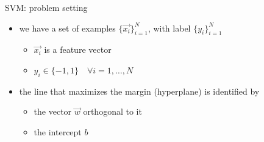 \begin{frame}{SVM: problem setting}
\begin{itemize}
\item we have a set of examples $\{\vec{x_i}\}_{i=1}^N$, with label $\{y_i\}_{i=1}^N$
\begin{itemize}
\item $\vec{x_i}$ is a feature vector
\item $y_i \in \{-1, 1\} \quad \forall i=1,\ldots,N$
\end{itemize}
\item the line that maximizes the margin (hyperplane) is identified by
\begin{itemize}
\item the vector $\vec{w}$ orthogonal to it
\item the intercept $b$
\end{itemize}
\end{itemize}
\end{frame}